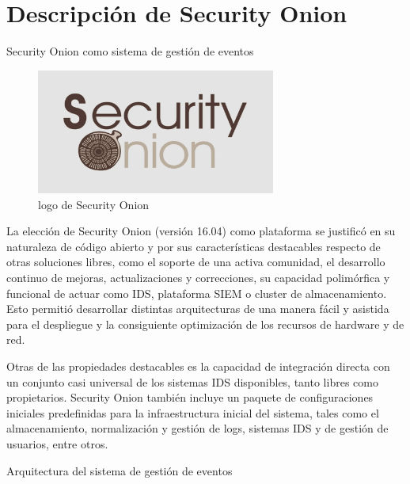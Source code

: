 \chapter{Descripción de Security Onion}
    \begin{section}{Security Onion como sistema de gestión de eventos}
    \begin{figure}[H]
        \centering
        \includegraphics[width=0.7\textwidth]{./descripcion_sonion_imagenes/figura_15_logo_sonion.png}
        \caption{logo de Security Onion\cite{sonion}}
        \label{fig:logo_sonion}
    \end{figure}
        La elección de Security Onion (versión 16.04) como plataforma se justificó en su naturaleza de código abierto y por sus características destacables respecto de otras soluciones libres, como el soporte de una activa comunidad, el desarrollo continuo de mejoras, actualizaciones y correcciones, su capacidad polimórfica y funcional de actuar como IDS, plataforma SIEM o cluster de almacenamiento. Esto permitió desarrollar distintas arquitecturas de una manera fácil y asistida para el despliegue y la consiguiente optimización de los recursos de hardware y de red. \par
        Otras de las propiedades destacables es la capacidad de integración directa con un conjunto casi universal de los sistemas IDS disponibles, tanto libres como propietarios. Security Onion también incluye un paquete de configuraciones iniciales predefinidas para la infraestructura inicial del sistema, tales como el almacenamiento, normalización y gestión de logs, sistemas IDS y de gestión de usuarios, entre otros. \par
    \end{section}
    \begin{section}{Arquitectura del sistema de gestión de eventos}
    \end{section}
